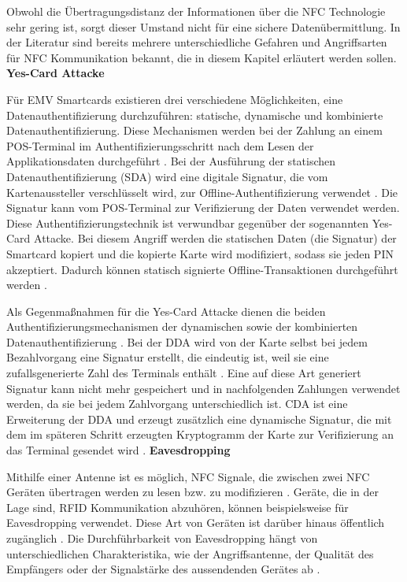 Obwohl die Übertragungsdistanz der Informationen über die NFC Technologie sehr gering ist, sorgt dieser Umstand nicht für eine sichere Datenübermittlung. In der Literatur sind bereits mehrere unterschiedliche Gefahren und Angriffsarten für NFC Kommunikation bekannt, die in diesem Kapitel erläutert werden sollen. 
\newline
\newline
\textbf{Yes-Card Attacke}

Für EMV Smartcards existieren drei verschiedene Möglichkeiten, eine Datenauthentifizierung durchzuführen: statische, dynamische und kombinierte Datenauthentifizierung. Diese Mechanismen werden bei der Zahlung an einem POS-Terminal im Authentifizierungsschritt nach dem Lesen der Applikationsdaten durchgeführt \cite{emvbook3, nfcRelayWithOffTheShelfHardAndSoftware}. Bei der Ausführung der statischen Datenauthentifizierung (SDA) wird eine digitale Signatur, die vom Kartenaussteller verschlüsselt wird, zur Offline-Authentifizierung verwendet \cite{sda}. Die Signatur kann vom POS-Terminal zur Verifizierung der Daten verwendet werden. Diese Authentifizierungstechnik ist verwundbar gegenüber der sogenannten Yes-Card Attacke. Bei diesem Angriff werden die statischen Daten (die Signatur) der Smartcard kopiert und die kopierte Karte wird modifiziert, sodass sie jeden PIN akzeptiert. Dadurch können statisch signierte Offline-Transaktionen durchgeführt werden \cite{nfcRelayWithOffTheShelfHardAndSoftware, Madlmayr2014}. 

Als Gegenmaßnahmen für die Yes-Card Attacke dienen die beiden Authentifizierungsmechanismen der dynamischen sowie der kombinierten Datenauthentifizierung \cite{nfcRelayWithOffTheShelfHardAndSoftware}. Bei der DDA wird von der Karte selbst bei jedem Bezahlvorgang eine Signatur erstellt, die eindeutig ist, weil sie eine zufallsgenerierte Zahl des Terminals enthält \cite{dda}. Eine auf diese Art generiert Signatur kann nicht mehr gespeichert und in nachfolgenden Zahlungen verwendet werden, da sie bei jedem Zahlvorgang unterschiedlich ist. CDA ist eine Erweiterung der DDA und erzeugt zusätzlich eine dynamische Signatur, die mit dem im späteren Schritt erzeugten Kryptogramm der Karte zur Verifizierung an das Terminal gesendet wird \cite{emvbook2}. 
\newline
\newline
\textbf{Eavesdropping}

Mithilfe einer Antenne ist es möglich, NFC Signale, die zwischen zwei NFC Geräten übertragen werden zu lesen bzw. zu modifizieren \cite{nfcTechVulnAttack}. Geräte, die in der Lage sind, RFID Kommunikation abzuhören, können beispielsweise für Eavesdropping verwendet. Diese Art von Geräten ist darüber hinaus öffentlich zugänglich \cite{eavesdropNfc}. Die Durchführbarkeit von Eavesdropping hängt von unterschiedlichen Charakteristika, wie der Angriffsantenne, der Qualität des Empfängers oder der Signalstärke des aussendenden Gerätes ab \cite{securityNfc}. 

